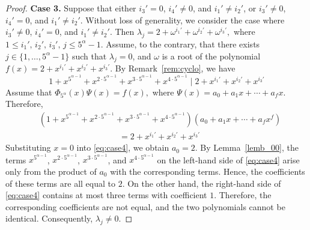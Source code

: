 \documentclass[12pt]{article}
\begin{document}
\begin{proof}
\textbf{Case 3.} Suppose that either $i_3'=0$, $i_4'\neq0$, and $i_1'\neq i_2'$, or $i_3'\neq0$, $i_4'=0$, and $i_1'\neq i_2'$. Without loss of generality, we consider the case where $i_3'\neq0$, $i_4'=0$, and $i_1'\neq i_2'$. Then
$
\lambda_j=2+\omega^{i_1'}+\omega^{i_2'}+\omega^{i_3'},
$
where $1\le i_1',\,i_2',\,i_3',\,j\le5^\alpha-1$. Assume, to the contrary, that there exists $j\in\{1,\ldots,5^\alpha-1\}$ such that $\lambda_j=0$, and $\omega$ is a root of the polynomial
$
f(x)=2+x^{i_1'}+x^{i_2'}+x^{i_3'}
$. By Remark~\ref{rem:cyclo}, we have
\[
1+x^{5^{\alpha-1}}+x^{2\cdot5^{\alpha-1}}+x^{3\cdot5^{\alpha-1}}+x^{4\cdot5^{\alpha-1}}
\mid
2+x^{i_1'}+x^{i_2'}+x^{i_3'}
\]
Assume that
$
\Phi_{5^\alpha}(x)\Psi(x)	=f(x),
$
where
$
\Psi(x)=a_0+a_1x+\cdots+a_fx.
$
Therefore,
\begin{equation}\label{eq:case4}
	\begin{aligned}
		&\left(1+x^{5^{\alpha-1}}+x^{2\cdot5^{\alpha-1}}+x^{3\cdot5^{\alpha-1}}+x^{4\cdot5^{\alpha-1}}\right)
		\left(a_0+a_1x+\cdots+a_fx^f\right)\\
		&\hspace{4cm}=2+x^{i_1'}+x^{i_2'}+x^{i_3'}
	\end{aligned}
\end{equation}
Substituting $x=0$ into \eqref{eq:case4}, we obtain $a_0=2$. By Lemma~\ref{lemb_00}, the terms $x^{5^{\alpha-1}}$, $x^{2\cdot5^{\alpha-1}}$, $x^{3\cdot5^{\alpha-1}}$, and $x^{4\cdot5^{\alpha-1}}$ on the left-hand side of \eqref{eq:case4} arise only from the product of $a_0$ with the corresponding terms. Hence, the coefficients of these terms are all equal to $2$. On the other hand, the right-hand side of \eqref{eq:case4} contains at most three terms with coefficient $1$. Therefore, the corresponding coefficients are not equal, and the two polynomials cannot be identical. Consequently, $\lambda_j\neq0$.

\medskip


\end{proof}
\end{document}
